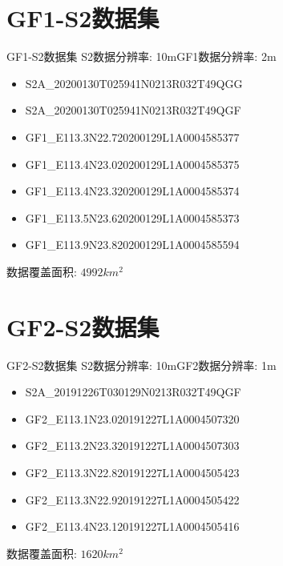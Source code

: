 \section{GF1-S2数据集}
\begin{frame}{GF1-S2数据集}
    S2数据分辨率: 10m\quad GF1数据分辨率: 2m
    \begin{itemize}
        \item S2A\_20200130T025941N0213R032T49QGG
        \item S2A\_20200130T025941N0213R032T49QGF
        \item GF1\_E113.3N22.720200129L1A0004585377
        \item GF1\_E113.4N23.020200129L1A0004585375
        \item GF1\_E113.4N23.320200129L1A0004585374
        \item GF1\_E113.5N23.620200129L1A0004585373
        \item GF1\_E113.9N23.820200129L1A0004585594
    \end{itemize}
    数据覆盖面积: $4992km^{2}$
\end{frame}

\section{GF2-S2数据集}
\begin{frame}{GF2-S2数据集}
    S2数据分辨率: 10m\quad GF2数据分辨率: 1m
    \begin{itemize}
        \item S2A\_20191226T030129N0213R032T49QGF
        \item GF2\_E113.1N23.020191227L1A0004507320
        \item GF2\_E113.2N23.320191227L1A0004507303
        \item GF2\_E113.3N22.820191227L1A0004505423
        \item GF2\_E113.3N22.920191227L1A0004505422
        \item GF2\_E113.4N23.120191227L1A0004505416
    \end{itemize}
    数据覆盖面积: $1620km^{2}$
\end{frame}

